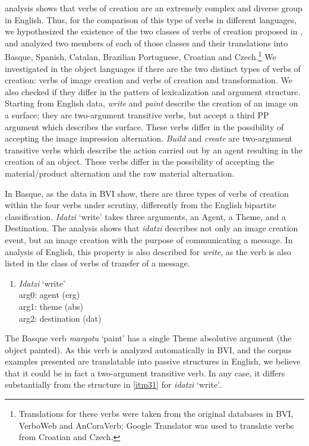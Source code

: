 \documentclass[english]{textolivre}
\begin{document}
 analysis shows that verbs of creation are an extremely complex and diverse group in English. Thus, for the comparison of this type of verbs in different languages, we hypothesized the existence of the two classes of verbs of creation proposed in \textcite{levin_english_1993}, and analyzed two members of each of those classes and their translations into Basque, Spanish, Catalan, Brazilian Portuguese, Croatian and Czech.\footnote{Translations for these verbs were taken from the original databases in BVI, VerboWeb and AnCoraVerb; Google Translator was used to translate verbs from Croatian and Czech.} We investigated in the object languages if there are the two distinct types of verbs of creation: verbs of image creation and verbs of creation and transformation. We also checked if they differ in the patters of lexicalization and argument structure. Starting from English data, \textit{write} and \textit{paint} describe the creation of an image on a surface; they are two-argument transitive verbs, but accept a third PP argument which describes the surface. These verbs differ in the possibility of accepting the image impression alternation. \textit{Build} and \textit{create} are two-argument transitive verbs which describe the action carried out by an agent resulting in the creation of an object. These verbs differ in the possibility of accepting the material/product alternation and the raw material alternation.

In Basque, as the data in BVI show, there are three types of verbs of creation within the four verbs under scrutiny, differently from the English bipartite classification. \textit{Idatzi} ‘write’ takes three arguments, an Agent, a Theme, and a Destination. The analysis shows that \textit{idatzi} describes not only an image creation event, but an image creation with the purpose of communicating a message. In  analysis of English, this property is also described for \textit{write}, as the verb is also listed in the class of verbs of transfer of a message.

\begin{enumerate}[label=(\arabic*),resume]
\item \label{itm31}\textit{Idatzi} ‘write’ \\
arg0: agent (erg) \\
arg1: theme (abs) \\
arg2: destination (dat)
\end{enumerate}
 
The Basque verb \textit{margotu} ‘paint’ has a single Theme absolutive argument (the object painted). As this verb is analyzed automatically in BVI, and the corpus examples presented are translatable into passive structures in English, we believe that it could be in fact a two-argument transitive verb. In any case, it differs substantially from the structure in \ref{itm31} for \textit{idatzi} ‘write’.
\end{document}
